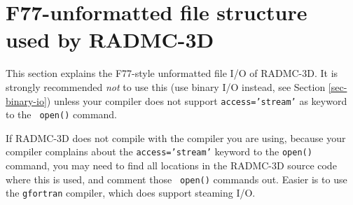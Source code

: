 \documentclass{report}
\begin{document}
\section{F77-unformatted file structure used by RADMC-3D}
\label{sec-unformatted-fortran}
%
This section explains the F77-style unformatted file I/O of RADMC-3D.
It is strongly recommended {\em not} to use this (use binary I/O
instead, see Section \ref{sec-binary-io}) unless your compiler does
not support {\small\tt access='stream'} as keyword to the {\small\tt
open()} command.

If RADMC-3D does not compile with the compiler you are using, because your
compiler complains about the {\small\tt access='stream'} keyword to the
{\small\tt open()} command, you may need to find all locations in the
RADMC-3D source code where this is used, and comment those {\small\tt
  open()} commands out. Easier is to use the {\small\tt gfortran} compiler,
which does support steaming I/O.
\end{document}
